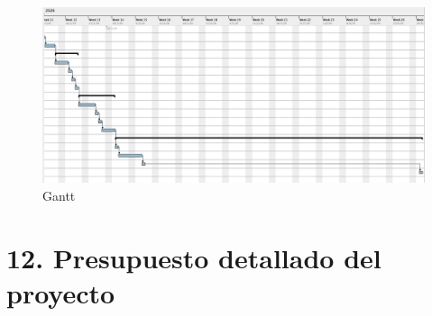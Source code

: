 \documentclass[
11pt, %
]{charter}
\begin{document}
\begin{landscape}
\begin{figure}[H]
\centering 
\includegraphics[width=1.5\textwidth]{./Figuras/gantt_2_2.png}
\caption{Gantt}
\label{fig:Gantt 2.2}
\end{figure}
\end{landscape}


\section{12. Presupuesto detallado del proyecto}
\label{sec:presupuesto}
\end{document}

